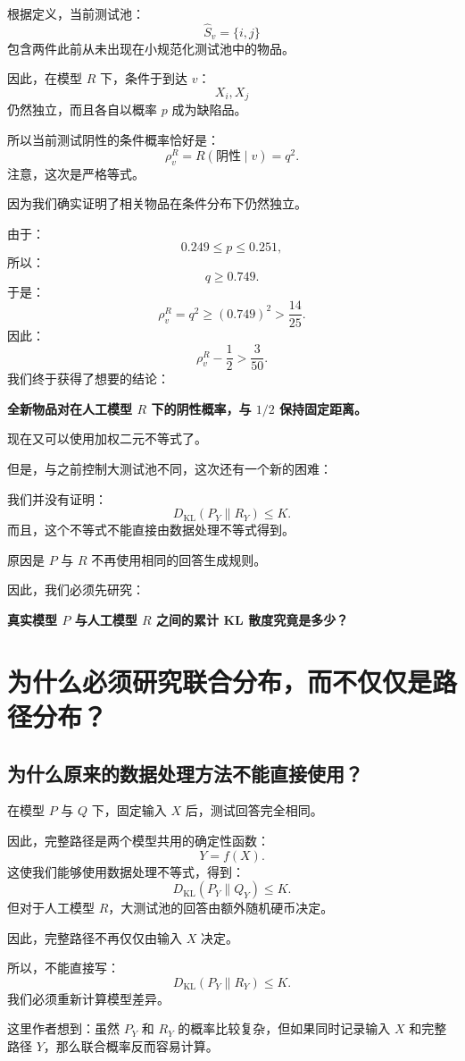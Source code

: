 \documentclass[UTF8,11pt]{ctexart}
\begin{document}
根据定义，当前测试池：
\[\widehat S_v=\{i,j\}\]
包含两件此前从未出现在小规范化测试池中的物品。

因此，在模型 $R$ 下，条件于到达 $v$：
\[X_i,X_j\]
仍然独立，而且各自以概率 $p$ 成为缺陷品。

所以当前测试阴性的条件概率恰好是：
\begin{equation}\boxed{\rho_v^R=R(\text{阴性}\mid v)=q^2.}\tag{30}\end{equation}
注意，这次是严格等式。

因为我们确实证明了相关物品在条件分布下仍然独立。

由于：
\[0.249\le p\le0.251,\]
所以：
\[q\ge0.749.\]
于是：
\[\rho_v^R=q^2\ge(0.749)^2>\frac{14}{25}.\]
因此：
\begin{equation}\boxed{\rho_v^R-\frac12>\frac3{50}.}\tag{31}\end{equation}
我们终于获得了想要的结论：

\textbf{全新物品对在人工模型 $R$ 下的阴性概率，与 $1/2$ 保持固定距离。}

现在又可以使用加权二元不等式了。

但是，与之前控制大测试池不同，这次还有一个新的困难：

我们并没有证明：
\[D_{\mathrm{KL}}(P_Y\|R_Y)\le K.\]
而且，这个不等式不能直接由数据处理不等式得到。

原因是 $P$ 与 $R$ 不再使用相同的回答生成规则。

因此，我们必须先研究：

\textbf{真实模型 $P$ 与人工模型 $R$ 之间的累计 KL 散度究竟是多少？}

\section{为什么必须研究联合分布，而不仅仅是路径分布？}
\subsection{为什么原来的数据处理方法不能直接使用？}
在模型 $P$ 与 $Q$ 下，固定输入 $X$ 后，测试回答完全相同。

因此，完整路径是两个模型共用的确定性函数：
\[Y=f(X).\]
这使我们能够使用数据处理不等式，得到：
\[D_{\mathrm{KL}}(P_Y\|Q_Y)\le K.\]
但对于人工模型 $R$，大测试池的回答由额外随机硬币决定。

因此，完整路径不再仅仅由输入 $X$ 决定。

所以，不能直接写：
\[D_{\mathrm{KL}}(P_Y\|R_Y)\le K.\]
我们必须重新计算模型差异。

这里作者想到：虽然 $P_Y$ 和 $R_Y$ 的概率比较复杂，但如果同时记录输入 $X$ 和完整路径 $Y$，那么联合概率反而容易计算。
\end{document}
